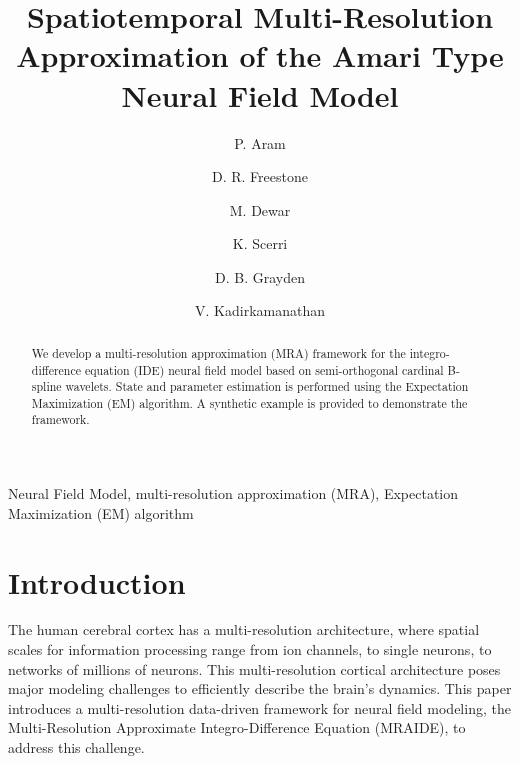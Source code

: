 \documentclass[review,authoryear,3p]{elsarticle}
\begin{document}
\begin{frontmatter}
\title{Spatiotemporal Multi-Resolution Approximation of the Amari Type Neural Field Model}
  
\author[TNG]{P. Aram}
\author[DEEE,BEI,UE]{D. R. Freestone}
\author[UE,CU]{M. Dewar}
\author[UM]{K. Scerri}
\author[DEEE,BEI]{D. B. Grayden}
\author[US]{V. Kadirkamanathan}

\address[TNG]{Theoretical Neuroscience Group, UMR 1106, Institut de Neurosciences des Systemes, 13385 Marseille, France}
\address[DEEE]{Department of Electrical and Electronic Engineering, University of Melbourne, Melbourne, VIC, Australia}
\address[BEI]{The Bionic Ear Institute, East Melbourne, VIC, Australia}
\address[UE]{Institute for Adaptive and Neural Computation, University of Edinburgh, Edinburgh, UK}
\address[CU]{Department of Applied Physics and Applied Mathematics, Columbia University, New York, NY, USA}
\address[UM]{Department of Systems and Control Engineering, University of Malta, Msida, MSD, Malta}
 \address[US]{Department of Automatic Control and Systems Engineering, University of Sheffield, Sheffield, UK}


\begin{abstract}
We develop a multi-resolution approximation (MRA) framework for the integro-difference equation (IDE) neural field model based on semi-orthogonal cardinal B-spline wavelets. State and parameter estimation is performed using the Expectation Maximization (EM) algorithm. A synthetic example is provided
to demonstrate the framework.
\end{abstract} 
\begin{keyword}
  Neural Field Model, multi-resolution approximation (MRA), Expectation Maximization (EM) algorithm
\end{keyword}

\end{frontmatter}


\section{Introduction}
The human cerebral cortex has a multi-resolution architecture, where spatial scales for information processing range from ion channels, to single neurons, to networks of millions of neurons. This multi-resolution cortical architecture poses major modeling challenges to efficiently describe the brain's dynamics. This paper introduces a multi-resolution data-driven framework for neural field modeling, the Multi-Resolution Approximate Integro-Difference Equation (MRAIDE), to address this challenge. 
\end{document}
